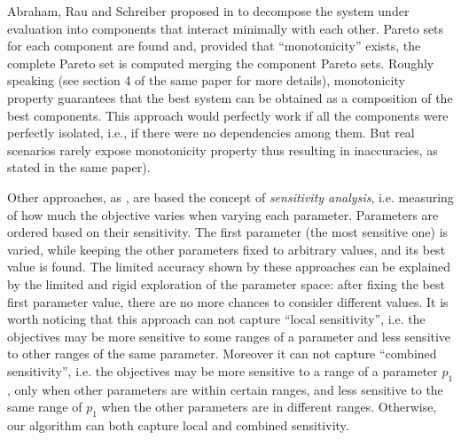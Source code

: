 Abraham, Rau and Schreiber proposed in \cite{santosh_hptr00} to
decompose the system under evaluation into components that interact
minimally with each other. Pareto sets for each component are found
and, provided that ``monotonicity'' exists, the complete Pareto set is
computed merging the component Pareto sets. Roughly speaking (see
section 4 of the same paper for more details), monotonicity property
guarantees that the best system can be obtained as a composition of
the best components. This approach would perfectly work if all the
components were perfectly isolated, i.e., if there were no
dependencies among them. But real scenarios rarely expose monotonicity
property thus resulting in inaccuracies, as stated in the same paper).

Other approaches, as \cite{fornaciari_codes01,palesi_iwsoc02}, are
based the concept of \emph{sensitivity analysis}, i.e. measuring of
how much the objective varies when varying each parameter.  Parameters
are ordered based on their sensitivity. The first parameter (the most
sensitive one) is varied, while keeping the other parameters fixed to
arbitrary values, and its best value is found. The limited accuracy
shown by these approaches can be explained by the limited and rigid
exploration of the parameter space: after fixing the best first
parameter value, there are no more chances to consider different
values. It is worth noticing that this approach can not capture
``local sensitivity'', i.e. the objectives may be more sensitive to
some ranges of a parameter and less sensitive to other ranges of the
same parameter. Moreover it can not capture ``combined sensitivity'',
i.e. the objectives may be more sensitive to a range of a parameter
$p_{1}$, only when other parameters are within certain ranges, and
less sensitive to the same range of $p_{1}$ when the other parameters
are in different ranges. Otherwise, our algorithm can both capture
local and combined sensitivity.

